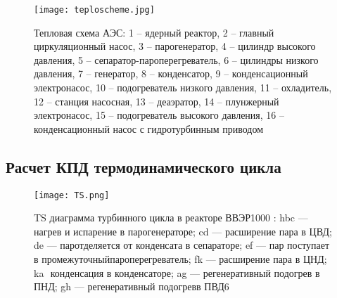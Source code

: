 \begin{figure}[H]
	\begin{center}
		\texttt{[image: teploscheme.jpg]}
		\caption{Тепловая схема АЭС: 1 – ядерный реактор, 2 – главный
циркуляционный насос, 3 – парогенератор, 4 – цилиндр высокого давления, 5 –
сепаратор-пароперегреватель, 6 – цилиндры низкого давления, 7 – генератор, 8
– конденсатор, 9 – конденсационный электронасос, 10 – подогреватель низкого
давления, 11 – охладитель, 12 – станция насосная, 13 – деаэратор, 14 –
плунжерный электронасос, 15 – подогреватель высокого давления, 16 –
конденсационный насос с гидротурбинным приводом}
		\label{pic:teplocheme} %
	\end{center}
\end{figure}


\subsection{Расчет КПД термодинамического цикла}


\begin{figure}[H]
	\begin{center}
		\texttt{[image: TS.png]}
		\caption{ T­S диаграмма турбинного цикла в реакторе ВВЭР­1000 : hbc —нагрев и испарение в парогенераторе; cd — расширение пара в ЦВД; de — паротделяется от конденсата в сепараторе; ef — пар поступает в промежуточныйпароперегреватель; fk — расширение пара в ЦНД; ka ­ конденсация в конден­саторе; ag — регенеративный подогрев в ПНД; gh — регенеративный подогревв ПВД6
        }
		\label{pic:TS} %
	\end{center}
\end{figure}

